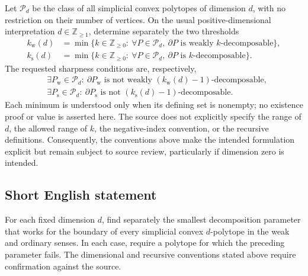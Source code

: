 \documentclass[11pt]{article}
\newcommand{\Z}{\mathbb{Z}}
\begin{document}
Let \(\mathcal P_d\) be the class of all simplicial convex polytopes of dimension \(d\), with no restriction on their number of vertices. On the usual positive-dimensional interpretation \(d\in\Z_{\ge1}\), determine separately the two thresholds
\[
\begin{aligned}
k_{\mathrm w}(d)&=\min\{k\in\Z_{\ge0}:\ \forall P\in\mathcal P_d,\ \partial P\text{ is weakly }k\text{-decomposable}\},\\
k_{\mathrm s}(d)&=\min\{k\in\Z_{\ge0}:\ \forall P\in\mathcal P_d,\ \partial P\text{ is }k\text{-decomposable}\}.
\end{aligned}
\]
The requested sharpness conditions are, respectively,
\[
\begin{aligned}
&\exists P_{\mathrm w}\in\mathcal P_d:\ \partial P_{\mathrm w}\text{ is not weakly }(k_{\mathrm w}(d)-1)\text{-decomposable},\\
&\exists P_{\mathrm s}\in\mathcal P_d:\ \partial P_{\mathrm s}\text{ is not }(k_{\mathrm s}(d)-1)\text{-decomposable}.
\end{aligned}
\]
Each minimum is understood only when its defining set is nonempty; no existence proof or value is asserted here. The source does not explicitly specify the range of \(d\), the allowed range of \(k\), the negative-index convention, or the recursive definitions. Consequently, the conventions above make the intended formulation explicit but remain subject to source review, particularly if dimension zero is intended.
\subsection{Short English statement}
For each fixed dimension \(d\), find separately the smallest decomposition parameter that works for the boundary of every simplicial convex \(d\)-polytope in the weak and ordinary senses. In each case, require a polytope for which the preceding parameter fails. The dimensional and recursive conventions stated above require confirmation against the source.
\end{document}
